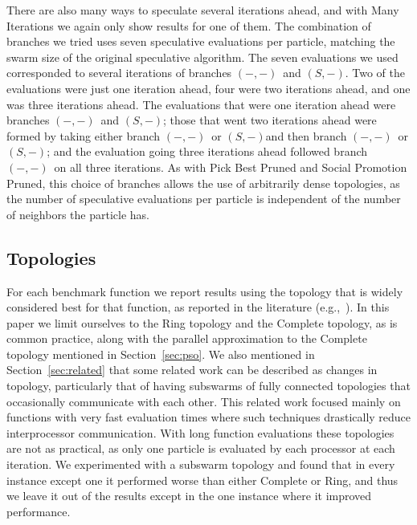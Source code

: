 \documentclass[smallcondensed]{svjour3}
\renewcommand{\sec}[1]{Section~\ref{sec:#1}}
\providecommand{\casexn}{\ensuremath{(S,-)}}
\providecommand{\casepn}{\ensuremath{(-,-)}}
\begin{document}
There are also many ways to speculate several iterations ahead, and with Many
Iterations we again only show results for one of them.  The combination of
branches we tried uses seven speculative evaluations per particle, matching the
swarm size of the original speculative algorithm.  The seven evaluations we
used corresponded to several iterations of branches \casepn\ and \casexn.  Two
of the evaluations were just one iteration ahead, four were two iterations
ahead, and one was three iterations ahead.  The evaluations that were one
iteration ahead were branches \casepn\ and \casexn; those that went two
iterations ahead were formed by taking either branch \casepn\ or \casexn and
then branch \casepn\ or \casexn; and the evaluation going three iterations
ahead followed branch \casepn\ on all three iterations.  As with Pick Best
Pruned and Social Promotion Pruned, this choice of branches allows the use of
arbitrarily dense topologies, as the number of speculative evaluations per
particle is independent of the number of neighbors the particle has.

\subsection{Topologies}

For each benchmark function we report results using the topology that is widely
considered best for that function, as reported in the literature
(e.g.,~\cite{bratton-2007-defining-a-standard-for-pso}).  In this paper we
limit ourselves to the Ring topology and the Complete topology, as is common
practice, along with the parallel approximation to the Complete topology
mentioned in \sec{pso}.  We also mentioned in \sec{related} that some related
work can be described as changes in topology, particularly that of having
subswarms of fully connected topologies that occasionally communicate with
each other.  This related work focused mainly on functions with very fast
evaluation times where such techniques drastically reduce interprocessor
communication.  With long function evaluations these topologies are not as
practical, as only one particle is evaluated by each processor at each
iteration.  We experimented with a subswarm topology and found that in every
instance except one it performed worse than either Complete or Ring, and thus
we leave it out of the results except in the one instance where it improved
performance.
\end{document}
